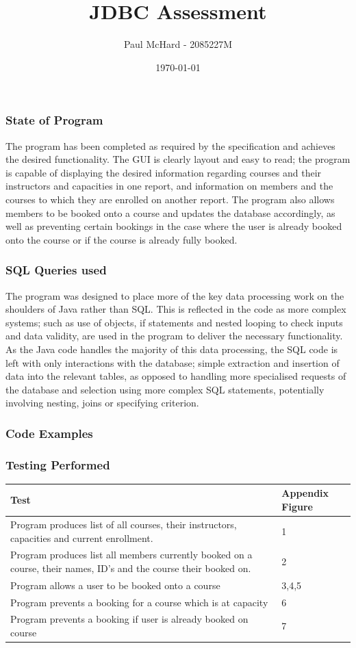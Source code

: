 \documentclass[12pt, oneside]{article}
\title{JDBC Assessment}
\author{Paul McHard - 2085227M}
\date{\today}
\begin{document}
\selectfont
\maketitle
\subsubsection*{State of Program}
The program has been completed as required by the specification and achieves the desired functionality. The GUI is clearly layout and easy to read; the program is capable of displaying the desired information regarding courses and their instructors and capacities in one report, and information on members and the courses to which they are enrolled on another report. The program also allows members to be booked onto a course and updates the database accordingly, as well as preventing certain bookings in the case where the user is already booked onto the course or if the course is already fully booked.
\subsubsection*{SQL Queries used}
The program was designed to place more of the key data processing work on the shoulders of Java rather than SQL. This is reflected in the code as more complex systems; such as use of objects, if statements  and nested looping to check inputs and data validity, are used in the program to deliver the necessary functionality. As the Java code handles the majority of this data processing, the SQL code is left with only interactions with the database; simple extraction and insertion of data into the relevant tables, as opposed to handling more specialised requests of the database and selection using more complex SQL statements, potentially involving nesting, joins or specifying criterion.
\subsubsection*{Code Examples}

\subsubsection*{Testing Performed}
\begin{center}
\begin{tabular}{ | m{12cm} | m{4cm} | } 
 \hline
 \textbf{Test} & \textbf{Appendix Figure} \\ 
  \hline
Program produces list of all courses, their instructors, capacities and current enrollment. & 1 \\ 
  \hline
 Program produces list all members currently booked on a course, their names, ID's and the course their booked on. & 2 \\ 
 \hline
 Program allows a user to be booked onto a course & 3,4,5 \\
 \hline
 Program prevents a booking for a course which is at capacity & 6 \\
 \hline
 Program prevents a booking if user is already booked on course & 7\\
 \hline
\end{tabular}
\end{center}
\end{document}

